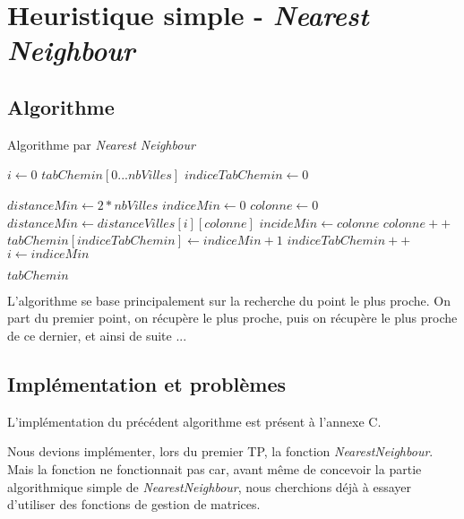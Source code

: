 \chapter{Heuristique simple - \textit{Nearest Neighbour}}

\section{Algorithme}

\begin{algorithm}
\caption{Algorithme par \textit{Nearest Neighbour}}
\begin{algorithmic}


\State $i \gets 0$
\State $tabChemin [0...nbVilles]$ 
\State $indiceTabChemin \gets 0$

	\State $distanceMin \gets 2*nbVilles$
	\State $indiceMin \gets 0$
	\State $colonne \gets 0$
			\State $distanceMin \gets distanceVilles[i][colonne]$
			\State $incideMin \gets colonne$
		\EndIf		
		\State $colonne++$
	\EndWhile
	\State $tabChemin[indiceTabChemin]\gets indiceMin +1$
	\State $indiceTabChemin++$
	\State $i\gets indiceMin$
\EndWhile

\Return $tabChemin$
\EndFunction
 \end{algorithmic}
\end{algorithm}

L'algorithme se base principalement sur la recherche du point le plus proche.
On part du premier point, on récupère le plus proche, puis on récupère le plus proche de ce dernier, et ainsi de suite ...

\section{Implémentation et problèmes}

L'implémentation du précédent algorithme est présent à l'annexe C.
\par\bigskip
Nous devions implémenter, lors du premier TP, la fonction \textit{NearestNeighbour}. Mais la fonction ne fonctionnait pas car, avant même de concevoir la partie algorithmique simple de \textit{NearestNeighbour}, nous cherchions déjà à essayer d'utiliser des fonctions de gestion de matrices.

